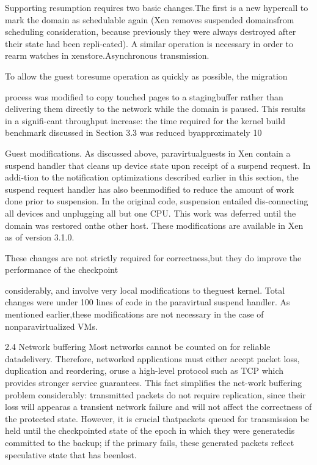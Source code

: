 Supporting resumption requires two basic changes.The first is a new hypercall to mark the domain as
schedulable again (Xen removes suspended domainsfrom scheduling consideration, because previously they
were always destroyed after their state had been repli-cated). A similar operation is necessary in order to rearm watches in xenstore.Asynchronous transmission.

To allow the guest toresume operation as quickly as possible, the migration

process was modified to copy touched pages to a stagingbuffer rather than delivering them directly to the network
while the domain is paused. This results in a signifi-cant throughput increase: the time required for the kernel
build benchmark discussed in Section 3.3 was reduced byapproximately 10%

Guest modifications. As discussed above, paravirtualguests in Xen contain a suspend handler that cleans up
device state upon receipt of a suspend request. In addi-tion to the notification optimizations described earlier in
this section, the suspend request handler has also beenmodified to reduce the amount of work done prior to suspension. In the original code, suspension entailed dis-connecting all devices and unplugging all but one CPU.
This work was deferred until the domain was restored onthe other host. These modifications are available in Xen
as of version 3.1.0.

These changes are not strictly required for correctness,but they do improve the performance of the checkpoint

considerably, and involve very local modifications to theguest kernel. Total changes were under 100 lines of code
in the paravirtual suspend handler. As mentioned earlier,these modifications are not necessary in the case of nonparavirtualized VMs.

2.4 Network buffering
Most networks cannot be counted on for reliable datadelivery. Therefore, networked applications must either accept packet loss, duplication and reordering, oruse a high-level protocol such as TCP which provides
stronger service guarantees. This fact simplifies the net-work buffering problem considerably: transmitted packets do not require replication, since their loss will appearas a transient network failure and will not affect the correctness of the protected state. However, it is crucial thatpackets queued for transmission be held until the checkpointed state of the epoch in which they were generatedis committed to the backup; if the primary fails, these
generated packets reflect speculative state that has beenlost.

